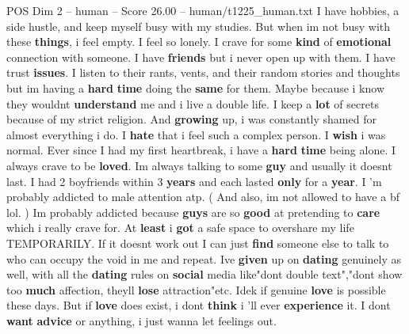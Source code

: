 \begin{textsample}{POS Dim 2 – human – Score 26.00 – human/t1225\_human.txt}  \label{ex:f2_pos_021}
I have hobbies, a side hustle, and keep myself busy with my studies.
But when im not busy with these \textbf{things}, i feel empty.
I feel so lonely.
I crave for some \textbf{kind} of \textbf{emotional} connection with someone.
I have \textbf{friends} but i never open up with them.
I have trust \textbf{issues}.
I listen to their rants, vents, and their random stories and thoughts but im having a \textbf{hard} \textbf{time} doing the \textbf{same} for them.
Maybe because i know they wouldnt \textbf{understand} me and i live a double life.
I keep a \textbf{lot} of secrets because of my strict religion.
And \textbf{growing} up, i was constantly shamed for almost everything i do.
I \textbf{hate} that i feel such a complex person.
I \textbf{wish} i was normal.
Ever since I had my first heartbreak, i have a \textbf{hard} \textbf{time} being alone.
I always crave to be \textbf{loved}.
Im always talking to some \textbf{guy} and usually it doesnt last.
I had 2 boyfriends within 3 \textbf{years} and each lasted \textbf{only} for a \textbf{year}.
I 'm probably addicted to male attention atp. ( And also, im not allowed to have a bf lol. ) Im probably addicted because \textbf{guys} are so \textbf{good} at pretending to \textbf{care} which i really crave for.
At \textbf{least} i \textbf{got} a safe space to overshare my life TEMPORARILY.
If it doesnt work out I can just \textbf{find} someone else to talk to who can occupy the void in me and repeat.
Ive \textbf{given} up on \textbf{dating} genuinely as well, with all the \textbf{dating} rules on \textbf{social} media like"dont double text","dont show too \textbf{much} affection, theyll \textbf{lose} attraction"etc.
Idek if genuine \textbf{love} is possible these days.
But if \textbf{love} does exist, i dont \textbf{think} i 'll ever \textbf{experience} it.
I dont \textbf{want} \textbf{advice} or anything, i just wanna let feelings out.

\end{textsample}
